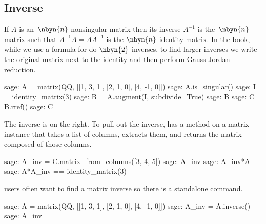 \subsection{Inverse}
If $A$ is an~$\nbyn{n}$ nonsingular matrix then its inverse $A^{-1}$
is the~$\nbyn{n}$ matrix such that $A^{-1}A=AA^{-1}$ is the 
$\nbyn{n}$ identity matrix. 
In the book, while we use a formula for do $\nbyn{2}$ inverses,
to find larger inverses 
we write the original matrix next to the identity
and then perform Gauss-Jordan reduction.
\begin{sagecommandline}
sage: A = matrix(QQ, [[1, 3, 1], [2, 1, 0], [4, -1, 0]])
sage: A.is_singular()
sage: I = identity_matrix(3)
sage: B = A.augment(I, subdivide=True)
sage: B
sage: C = B.rref()
sage: C
\end{sagecommandline}
The inverse is on the right.
To pull out the inverse, 
\Sage{} has a  method 
on a matrix instance that takes a list of 
columns, extracts them, and returns the matrix composed of those columns.
\begin{sagecommandline}
sage: A_inv = C.matrix_from_columns([3, 4, 5])
sage: A_inv
sage: A_inv*A
sage: A*A_inv == identity_matrix(3)
\end{sagecommandline}

\Sage{} users often want to find a matrix inverse so there is a
standalone command.
\begin{sagecommandline}[d,0,1]
sage: A = matrix(QQ, [[1, 3, 1], [2, 1, 0], [4, -1, 0]])
sage: A_inv = A.inverse()
sage: A_inv
\end{sagecommandline}


